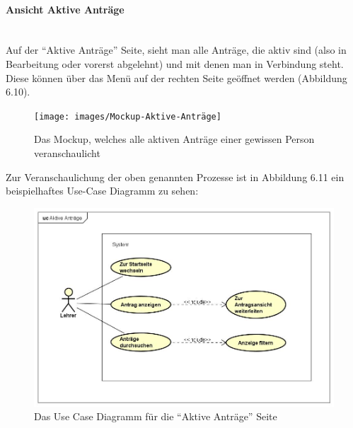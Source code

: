 \paragraph{Ansicht Aktive Anträge}
~\\
Auf der \enquote{Aktive Anträge} Seite, sieht man alle Anträge, die aktiv sind (also in Bearbeitung oder vorerst abgelehnt) und mit denen man in Verbindung steht. Diese können über das Menü auf der rechten Seite geöffnet werden (Abbildung 6.10).
\begin{figure}[H]
	\centering
	\texttt{[image: images/Mockup-Aktive-Anträge]}
	\caption[Mokup aktive Anträge]{Das Mockup, welches alle aktiven Anträge einer gewissen Person veranschaulicht}
	\label{fig:mockupAktive}
\end{figure}
Zur Veranschaulichung der oben genannten Prozesse ist in Abbildung 6.11 ein beispielhaftes Use-Case Diagramm zu sehen: 
\begin{figure}[H]
	\centering
	\includegraphics[width=1\linewidth]{images/uc-active}
	\caption[Use Case Diagramm Aktive Anträge]{Das Use Case Diagramm für die \enquote{Aktive Anträge} Seite}
	\label{fig:ucAktiv}
\end{figure}
\newpage
